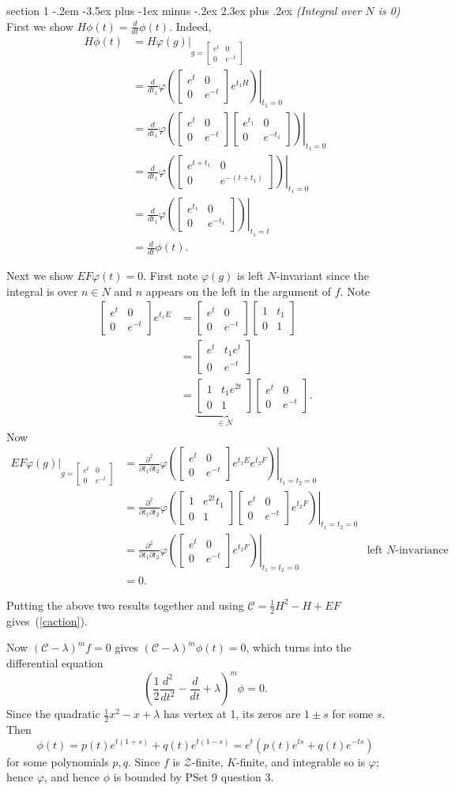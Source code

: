 \documentclass[12pt]{article}
\makeatletter
\theoremstyle{norm}
\providecommand{\cal}[1]{\mathcal{#1}}
\renewcommand{\cal}[1]{\mathcal{#1}}
\newcommand{\rc}[1]{\frac{1}{#1}}
\newcommand{\la}[0]{\lambda}
\newcommand{\ph}[0]{\varphi}
\newcommand{\pa}[1]{\left( {#1} \right)}
\newcommand{\pd}[2]{\frac{\partial #1}{\partial #2}}
\newcommand{\matt}[4]{
\left[
\begin{matrix}
{#1}&{#2}\\
{#3}&{#4}
\end{matrix}
\right]}
\newcommand{\smatt}[4]{
\left[
\begin{smallmatrix}
{#1}&{#2}\\
{#3}&{#4}
\end{smallmatrix}
\right]}
\newenvironment{problem}{\@startsection
       {section}
       {1}
       {-.2em}
       {-3.5ex plus -1ex minus -.2ex}
       {2.3ex plus .2ex}
       {\pagebreak[3]%
       \large\bf\noindent{Problem }
       }
       }
       {
       }
\makeatother
\begin{document}
\begin{problem}{\it (Integral over $N$ is 0)}
First we show $H\phi(t)=\frac{d}{dt}\phi(t)$.%
Indeed,
\begin{align*}
H\phi(t)&=
H\ph(g)|_{g=\smatt {e^t}00{e^{-t}}}\\
&=\left.\frac{d}{dt_1}\ph\pa{
\matt {e^t}00{e^{-t}}
e^{t_1H}}\right|_{t_1=0}\\
&
=\left.\frac{d}{dt_1}\ph\pa{
\matt {e^t}00{e^{-t}}
\matt {e^{t_1}}00{e^{-t_1}}
}\right|_{t_1=0}\\
&
=\left.\frac{d}{dt_1}\ph\pa{
\matt {e^{t+t_1}}00{e^{-(t+t_1)}}}\right|_{t_1=0}
\\
&
=\left.\frac{d}{dt_1}\ph\pa{
\matt {e^{t_1}}00{e^{-t_1}}}\right|_{t_1=t}
\\
&=\frac{d}{dt}\phi(t).
\end{align*}

Next we show $EF\ph(t)=0$. First note $\ph(g)$ is left $N$-invariant since the integral is over $n\in N$ and $n$ appears on the left in the argument of $f$. Note
\begin{align*}
\matt{e^t}{0}{0}{e^{-t}}e^{t_1E}&=\matt{e^t}{0}{0}{e^{-t}}\matt 1{t_1}01\\
&=\matt{e^t}{t_1e^t}0{e^{-t}}\\
&=\underbrace{\matt{1}{t_1e^{2t}}{0}{1}}_{\in N}\matt{e^t}00{e^{-t}}.
\end{align*}
Now
\begin{align*}
EF\ph(g)|_{g=\smatt{e^t}{0}{0}{e^{-t}}}&=\left.\pd{^2}{t_1\partial t_2} \ph\pa{
\matt{e^t}00{e^{-t}}e^{t_1E}e^{t_2F}
}\right|_{t_1=t_2=0}\\
&=\left.\pd{^2}{t_1\partial t_2} \ph\pa{
\matt{1}{e^{2t}t_1}{0}{1}
\matt{e^t}00{e^{-t}}e^{t_2F}
}\right|_{t_1=t_2=0}\\
&=\left.\pd{^2}{t_1\partial t_2} 
\ph\pa{\matt{e^t}00{e^{-t}}e^{t_2F}
}\right|_{t_1=t_2=0}&\text{left $N$-invariance}\\
&=0.
\end{align*}

Putting the above two results together and using $\cal C=\rc2 H^2-H+EF$ gives~(\ref{caction}).

Now $(\cal C-\la)^mf=0$ gives $(\cal C-\la)^m\phi(t)=0$, which turns into the differential equation
\[
\pa{\rc 2\frac{d^2}{dt^2}-\frac{d}{dt}+\la}^m\phi=0.
\]
Since the quadratic $\rc 2x^2-x+\la$ has vertex at 1, its zeros are $1\pm s$ for some $s$. Then
\[
\phi(t)=p(t)e^{t(1+s)}+q(t)e^{t(1-s)}=e^t(p(t)e^{ts}+q(t)e^{-ts})
\]
for some polynomials $p,q$. Since $f$ is $\cal Z$-finite, $K$-finite, and integrable so is $\ph$; hence $\ph$, and hence $\phi$ is bounded by PSet 9 question 3.


\end{problem}
\end{document}
